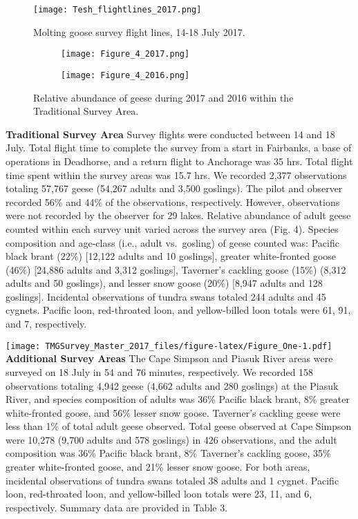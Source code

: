 \documentclass[]{article}
\begin{document}
\begin{figure}[h]
\texttt{[image: Tesh\_flightlines\_2017.png]}
\caption{Molting goose survey flight lines, 14-18 July 2017.}
\end{figure}

\begin{figure}
\centering
\begin{subfigure}[h]{0.85\textwidth}
\texttt{[image: Figure\_4\_2017.png]}
\end{subfigure}
\begin{subfigure}[h]{0.85\textwidth}
\texttt{[image: Figure\_4\_2016.png]}
\end{subfigure}
\caption{Relative abundance of geese during 2017 and 2016 within the Traditional Survey Area.}
\end{figure}

\textbf{Traditional Survey Area}\newline
Survey flights were conducted between 14 and 18 July. Total flight time
to complete the survey from a start in Fairbanks, a base of operations
in Deadhorse, and a return flight to Anchorage was 35 hrs. Total flight
time spent within the survey areas was 15.7 hrs. We recorded 2,377
observations totaling 57,767 geese (54,267 adults and 3,500 goslings).
The pilot and observer recorded 56\% and 44\% of the observations,
respectively. However, observations were not recorded by the observer
for 29 lakes. Relative abundance of adult geese counted within each
survey unit varied across the survey area (Fig. 4). Species composition
and age-class (i.e., adult vs.~gosling) of geese counted was: Pacific
black brant (22\%) {[}12,122 adults and 10 goslings{]}, greater
white-fronted goose (46\%) {[}24,886 adults and 3,312 goslings{]},
Taverner's cackling goose (15\%) (8,312 adults and 50 goslings), and
lesser snow goose (20\%) {[}8,947 adults and 128 goslings{]}. Incidental
observations of tundra swans totaled 244 adults and 45 cygnets. Pacific
loon, red-throated loon, and yellow-billed loon totals were 61, 91, and
7, respectively.

\texttt{[image: TMGSurvey\_Master\_2017\_files/figure-latex/Figure\_One-1.pdf]}
\textbf{Additional Survey Areas}\newline
The Cape Simpson and Piasuk River areas were surveyed on 18 July in 54
and 76 minutes, respectively. We recorded 158 observations totaling
4,942 geese (4,662 adults and 280 goslings) at the Piasuk River, and
species composition of adults was 36\% Pacific black brant, 8\% greater
white-fronted goose, and 56\% lesser snow goose. Taverner's cackling
geese were less than 1\% of total adult geese observed. Total geese
observed at Cape Simpson were 10,278 (9,700 adults and 578 goslings) in
426 observations, and the adult composition was 36\% Pacific black
brant, 8\% Taverner's cackling goose, 35\% greater white-fronted goose,
and 21\% lesser snow goose. For both areas, incidental observations of
tundra swans totaled 38 adults and 1 cygnet. Pacific loon, red-throated
loon, and yellow-billed loon totals were 23, 11, and 6, respectively.
Summary data are provided in Table 3.
\end{document}
